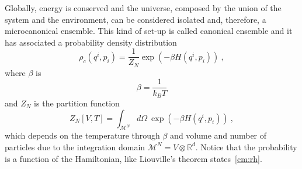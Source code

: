     Globally, energy is conserved and the universe, composed by the union of the system and the environment, can be considered isolated and, therefore, a microcanonical ensemble. This kind of set-up is called canonical ensemble and it has associated a probability density distribution 
    \begin{equation}\label{c:pdd}
        \rho_c (q^i, p_i) = \frac{1}{Z_N} \exp (-\beta H(q^i, p_i)) ~,
    \end{equation}
    where $\beta$ is 
    \begin{equation*}
        \beta = \frac{1}{k_B T}
    \end{equation*}
    and $Z_N$ is the partition function 
    \begin{equation}\label{c:z}
        Z_N[V, T] = \int_{\mathcal M^N} d\Omega ~\exp (-\beta H(q^i, p_i)) ~,
    \end{equation}
    which depends on the temperature through $\beta$ and volume and number of particles due to the integration domain $\mathcal M^N = V \otimes \mathbb R^d$. Notice that the probability is a function of the Hamiltonian, like Liouville's theorem states~\eqref{cm:rh}.
